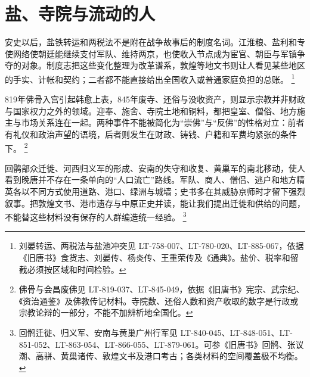 \section{盐、寺院与流动的人}
\label{sec:late-tang-money-religion-mobility}

安史以后，盐铁转运和两税法不是附在战争故事后的制度名词。江淮粮、盐利和专使网络使朝廷能继续支付军队、维持两京，也使收入节点成为宦官、朝臣与军镇争夺的对象。制度志把这些变化整理为改革谱系，敦煌等地文书则让人看见某些地区的手实、计帐和契约；二者都不能直接给出全国收入或普通家庭负担的总账。%
\footnote{刘晏转运、两税法与盐池冲突见 LT-758-007、LT-780-020、LT-885-067，依据《旧唐书》食货志、刘晏传、杨炎传、王重荣传及《通典》。盐价、税率和留截必须按区域和时间检验。}

819年佛骨入宫引起韩愈上表，845年废寺、还俗与没收资产，则显示宗教并非财政与国家权力之外的领域。迎奉、施舍、寺院土地和铜料，都把皇室、僧俗、地方施主与市场关系连在一起。两种事件不能被简化为“崇佛”与“反佛”的性格对立：前者有礼仪和政治声望的语境，后者则发生在财政、铸钱、户籍和军费均紧张的条件下。%
\footnote{佛骨与会昌废佛见 LT-819-037、LT-845-049，依据《旧唐书》宪宗、武宗纪、《资治通鉴》及佛教传记材料。寺院数、还俗人数和资产收取的数字是行政或宗教论辩的一部分，不能不加辨析地全国化。}

回鹘部众迁徙、河西归义军的形成、安南的失守和收复、黄巢军的南北移动，使人看到晚唐并不存在一条单向的“人口流亡”路线。军队、商人、僧侣、逃户和地方精英各以不同方式使用道路、港口、绿洲与城墙；史书多在其威胁京师时才留下强烈叙事。把敦煌文书、港市遗存与中原正史并读，能让我们提出迁徙和供给的问题，不能替这些材料没有保存的人群编造统一经验。%
\footnote{回鹘迁徙、归义军、安南与黄巢广州行军见 LT-840-045、LT-848-051、LT-851-052、LT-863-054、LT-866-055、LT-879-061。可参《旧唐书》回鹘、张议潮、高骈、黄巢诸传、敦煌文书及港口考古；各类材料的空间覆盖极不均衡。}
